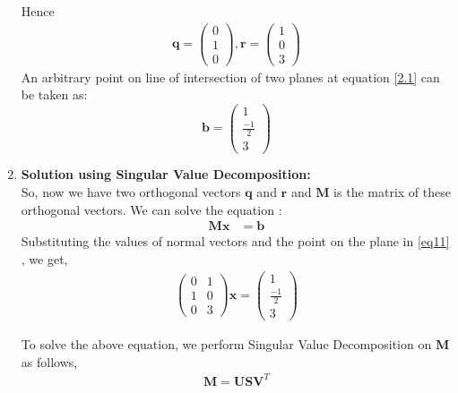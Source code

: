 \documentclass[journal,12pt,twocolumn]{IEEEtran}
\let\vec\mathbf
\numberwithin{equation}{subsection}
\newcommand{\myvec}[1]{\ensuremath{\begin{pmatrix}#1\end{pmatrix}}}
\begin{document}
\begin{enumerate}
Hence 
\begin{align}
\vec{q} = \myvec{0\\1\\0}, \vec{r} = \myvec{1\\0\\3}
\end{align}
An arbitrary point on line of intersection of two planes at equation \eqref{2.1} can be taken as:
\begin{equation}
	\vec{b} = \myvec{1 \\ \frac{-1}{2} \\ 3} \label{2.28}
\end{equation}
\item \textbf{Solution using Singular Value Decomposition:}\\
So, now we have two orthogonal vectors $\vec{q}$ and $\vec{r}$ and $\vec{M}$ is the matrix of these orthogonal vectors. We  can solve the equation :
\begin{align}
\vec{M}\vec{x} &= \vec{b}\label{eq11} 
\end{align}
Substituting the values of normal vectors and the point on the plane in \eqref{eq11} , we get,
\begin{align}
 \myvec{0 &1\\1 & 0\\0 & 3} \vec{x} = 	 \myvec{1 \\ \frac{-1}{2} \\ 3}
 \end{align}

To solve the above equation, we  perform Singular Value Decomposition on $\vec{M}$ as follows,
\begin{align}
\vec{M}=\vec{U}\vec{S}\vec{V}^T \label{2.20}
\end{align}


\end{enumerate}
\end{document}

